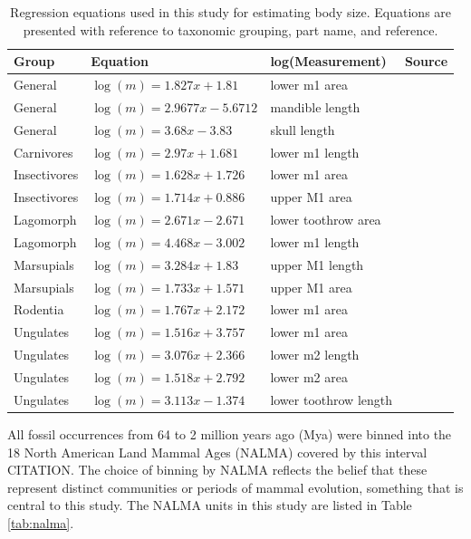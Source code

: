 \documentclass[12pt,letterpaper]{article}
\begin{document}
\begin{table}[ht]
  \centering
  \caption{Regression equations used in this study for estimating body size. Equations are presented with reference to taxonomic grouping, part name, and reference.}
  \begin{tabular}{l | l | l | l}
    \hline
    Group & Equation & log(Measurement) & Source \\
    \hline
    General & \(\log(m) = 1.827x + 1.81\) & lower m1 area &  \cite{Legendre1986} \\
    General & \(\log(m) = 2.9677x - 5.6712\) & mandible length & \cite{Foster2009a} \\
    General & \(\log(m) = 3.68x - 3.83\) & skull length & \cite{Luo2001} \\
    Carnivores & \(\log(m) = 2.97x + 1.681\) & lower m1 length & \cite{VanValkenburgh1990} \\
    Insectivores & \(\log(m) = 1.628x + 1.726\) & lower m1 area & \cite{Bloch1998} \\
    Insectivores & \(\log(m) = 1.714x + 0.886\) & upper M1 area & \cite{Bloch1998} \\
    Lagomorph & \(\log(m) = 2.671x - 2.671\) & lower toothrow area & \cite{Tomiya2013} \\
    Lagomorph & \(\log(m) = 4.468x - 3.002\) & lower m1 length & \cite{Tomiya2013} \\
    Marsupials & \(\log(m) = 3.284x + 1.83\) & upper M1 length & \cite{Gordon2003} \\
    Marsupials & \(\log(m) = 1.733x + 1.571\) & upper M1 area & \cite{Gordon2003} \\
    Rodentia & \(\log(m) = 1.767x + 2.172\) & lower m1 area & \cite{Legendre1986} \\
    Ungulates & \(\log(m) = 1.516x + 3.757\) & lower m1 area & \cite{Mendoza2006} \\
    Ungulates & \(\log(m) = 3.076x + 2.366\) & lower m2 length & \cite{Mendoza2006} \\
    Ungulates & \(\log(m) = 1.518x + 2.792\) & lower m2 area & \cite{Mendoza2006} \\
    Ungulates & \(\log(m) = 3.113x - 1.374\) & lower toothrow length & \cite{Mendoza2006} \\
    \hline
  \end{tabular}
  \label{tab:mass_est}
\end{table}


All fossil occurrences from 64 to 2 million years ago (Mya) were binned into the 18 North American Land Mammal Ages (NALMA) covered by this interval CITATION. The choice of binning by NALMA reflects the belief that these represent distinct communities or periods of mammal evolution, something that is central to this study. The NALMA units in this study are listed in Table \ref{tab:nalma}. %
\end{document}
